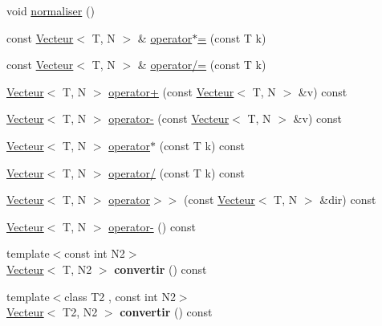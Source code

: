 \begin{DoxyCompactItemize}
\item 
void \hyperlink{class_vecteur_aaeb288e1b305145341bca772cd1d572f}{normaliser} ()
\item 
const \hyperlink{class_vecteur}{Vecteur}$<$ T, N $>$ \& \hyperlink{class_vecteur_ac8583c8d7bb0160ecde65ae1bcb25f32}{operator$\ast$=} (const T k)
\item 
const \hyperlink{class_vecteur}{Vecteur}$<$ T, N $>$ \& \hyperlink{class_vecteur_afef2e22b6a9a8b0ae76dfbf430644ed7}{operator/=} (const T k)
\item 
\hyperlink{class_vecteur}{Vecteur}$<$ T, N $>$ \hyperlink{class_vecteur_a9e0176d2ba6309bdd1f1a4507f42e95a}{operator+} (const \hyperlink{class_vecteur}{Vecteur}$<$ T, N $>$ \&v) const 
\item 
\hyperlink{class_vecteur}{Vecteur}$<$ T, N $>$ \hyperlink{class_vecteur_a27e5c7511ade885e14b5d3ec391f0e94}{operator-\/} (const \hyperlink{class_vecteur}{Vecteur}$<$ T, N $>$ \&v) const 
\item 
\hyperlink{class_vecteur}{Vecteur}$<$ T, N $>$ \hyperlink{class_vecteur_aaad0e8809c51aa00578c756eb18e28b9}{operator$\ast$} (const T k) const 
\item 
\hyperlink{class_vecteur}{Vecteur}$<$ T, N $>$ \hyperlink{class_vecteur_a0774ec943baa91dc506693a3fb9c1bff}{operator/} (const T k) const 
\item 
\hyperlink{class_vecteur}{Vecteur}$<$ T, N $>$ \hyperlink{class_vecteur_a94815bbd743aa7c282ff1c4d509c4c27}{operator$>$$>$} (const \hyperlink{class_vecteur}{Vecteur}$<$ T, N $>$ \&dir) const 
\item 
\hyperlink{class_vecteur}{Vecteur}$<$ T, N $>$ \hyperlink{class_vecteur_a9749c692393d634fac9ebf663a261a19}{operator-\/} () const 
\item 
\hypertarget{class_vecteur_a06c3800145756744698c41603078d0a4}{{\footnotesize template$<$const int N2$>$ }\\\hyperlink{class_vecteur}{Vecteur}$<$ T, N2 $>$ {\bfseries convertir} () const }\label{class_vecteur_a06c3800145756744698c41603078d0a4}

\item 
\hypertarget{class_vecteur_a5fe93e22709412c575e369b6295549d5}{{\footnotesize template$<$class T2 , const int N2$>$ }\\\hyperlink{class_vecteur}{Vecteur}$<$ T2, N2 $>$ {\bfseries convertir} () const }\label{class_vecteur_a5fe93e22709412c575e369b6295549d5}

\end{DoxyCompactItemize}
